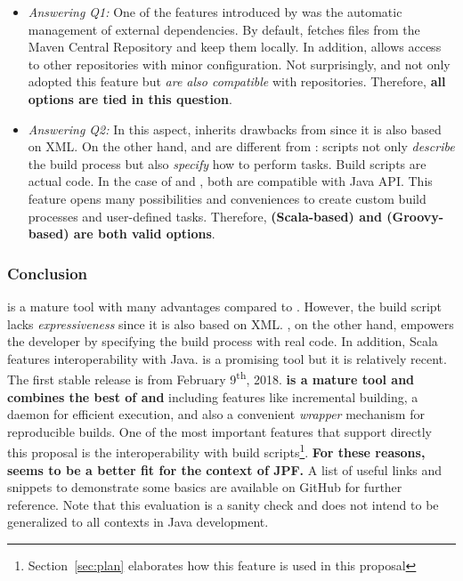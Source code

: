 \documentclass{article}
\begin{document}
\begin{itemize}
\item \emph{Answering Q1:}
One of the features introduced by \maven{} was the automatic management of
external dependencies.
By default, \maven{} fetches \jar{} files from the Maven Central
Repository\cite{page:mvncentral} and keep them locally.
In addition, \maven{} allows access to other repositories\cite{page:mvnrepo}
with minor configuration.
Not surprisingly, \gradle{} and \sbt{} not only adopted this feature but
\emph{are also compatible} with \maven{} repositories.
Therefore, \textbf{all options are tied in this question}.

\item \emph{Answering Q2:}
In this aspect, \maven{} inherits drawbacks from \ant{} since it is also based
on XML.
On the other hand, \gradle{} and \sbt{} are different from \maven{}: scripts
not only \emph{describe} the build process but also \emph{specify} how to
perform tasks.
Build scripts are actual code.
In the case of \sbt{} and \gradle{}, both are compatible with Java API.
This feature opens many possibilities and conveniences to create custom build
processes and user-defined tasks.
Therefore, \textbf{\sbt{} (Scala-based) and \gradle{} (Groovy-based) are both
valid options}.

\end{itemize}

\subsubsection*{Conclusion}
\maven{} is a mature tool with many advantages compared to \ant{}.
However, the build script lacks \emph{expressiveness} since it is also based on
XML.
\sbt{}, on the other hand, empowers the developer by specifying the build
process with real code.
In addition, Scala features interoperability with Java.
\sbt{} is a promising tool but it is relatively recent.
The first stable release is from February 9\textsuperscript{th},
2018\cite{page:sbt-release}.
\textbf{\gradle{} is a mature tool and combines the best of \maven{} and \sbt{}}
including features like incremental building, a daemon for efficient
execution\cite{page:gradle-daemon}, and also a convenient \emph{wrapper}
mechanism\cite{page:gradle-wrapper} for reproducible builds.
One of the most important \gradle{} features that support directly this
proposal is the interoperability with \ant{} build
scripts\cite{page:gradle-ant-support}\footnote{Section~\ref{sec:plan}
elaborates how this feature is used in this proposal}.
\textbf{For these reasons, \gradle{} seems to be a better fit for the context
of JPF.}
A list of useful links and snippets to demonstrate some \gradle{} basics are
available on GitHub\cite{page:gradle-labs} for further reference. 
Note that this evaluation is a sanity check and does not intend to be
generalized to all contexts in Java development.

\clearpage


\end{document}
